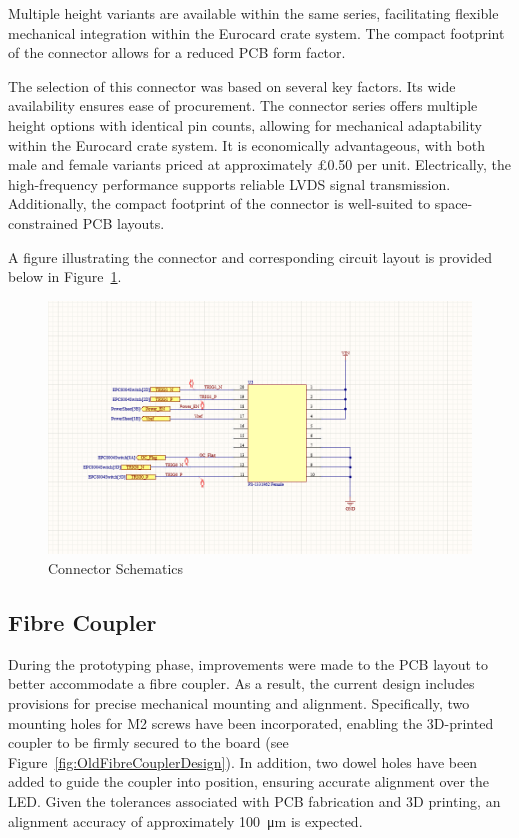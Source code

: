 \documentclass[a4paper,11pt]{article}
\begin{document}
Multiple height variants are available within the same series, facilitating flexible mechanical integration within the Eurocard crate system. The compact footprint of the connector allows for a reduced PCB form factor.

The selection of this connector was based on several key factors. Its wide availability ensures ease of procurement. The connector series offers multiple height options with identical pin counts, allowing for mechanical adaptability within the Eurocard crate system. It is economically advantageous, with both male and female variants priced at approximately \pounds 0.50 per unit. Electrically, the high-frequency performance supports reliable LVDS signal transmission. Additionally, the compact footprint of the connector is well-suited to space-constrained PCB layouts.

A figure illustrating the connector and corresponding circuit layout is provided below in Figure~\ref{fig:Connector}.

\begin{figure}[htbp]
\centering
\includegraphics[scale=0.5]{Connector.png}
\caption{Connector Schematics\label{fig:Connector}}
\end{figure}


\subsection{Fibre Coupler}

During the prototyping phase, improvements were made to the PCB layout to better accommodate a fibre coupler. As a result, the current design includes provisions for precise mechanical mounting and alignment. Specifically, two mounting holes for M2 screws have been incorporated, enabling the 3D-printed coupler to be firmly secured to the board (see Figure~\ref{fig:OldFibreCouplerDesign}). In addition, two dowel holes have been added to guide the coupler into position, ensuring accurate alignment over the LED. Given the tolerances associated with PCB fabrication and 3D printing, an alignment accuracy of approximately \SI{100}{\micro\metre} is expected.
\end{document}
